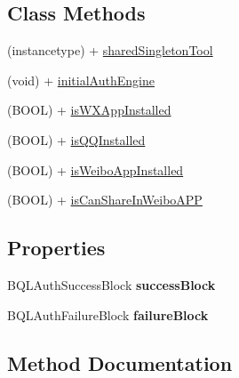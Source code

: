 \subsection*{Class Methods}
\begin{DoxyCompactItemize}
\item 
(instancetype) + \mbox{\hyperlink{interface_b_q_l_auth_engine_ae18d1835ec0364b5810d7bb79ba86f23}{shared\+Singleton\+Tool}}
\item 
(void) + \mbox{\hyperlink{interface_b_q_l_auth_engine_a8723ee35b1aa13e01ad3c7aa515d5834}{initial\+Auth\+Engine}}
\item 
(B\+O\+OL) + \mbox{\hyperlink{interface_b_q_l_auth_engine_ab080654fd3117bee16016ec387a6e512}{is\+W\+X\+App\+Installed}}
\item 
(B\+O\+OL) + \mbox{\hyperlink{interface_b_q_l_auth_engine_ad5464cda3e1336c1d315965f74298d03}{is\+Q\+Q\+Installed}}
\item 
(B\+O\+OL) + \mbox{\hyperlink{interface_b_q_l_auth_engine_ae7b4a462be6759372ef420fb2542356b}{is\+Weibo\+App\+Installed}}
\item 
(B\+O\+OL) + \mbox{\hyperlink{interface_b_q_l_auth_engine_ab3e8ce480dddadd1f4560775d10b0334}{is\+Can\+Share\+In\+Weibo\+A\+PP}}
\end{DoxyCompactItemize}
\subsection*{Properties}
\begin{DoxyCompactItemize}
\item 
\mbox{\label{interface_b_q_l_auth_engine_ae3bab26359b625d327471f8d3e88dd0d}} 
B\+Q\+L\+Auth\+Success\+Block {\bfseries success\+Block}
\item 
\mbox{\label{interface_b_q_l_auth_engine_a4dec62bd26347ef5366f78e903692ad0}} 
B\+Q\+L\+Auth\+Failure\+Block {\bfseries failure\+Block}
\end{DoxyCompactItemize}


\subsection{Method Documentation}
\mbox{\label{interface_b_q_l_auth_engine_ad00b02888295e09ea4bc1c764aea1e8f}} 
